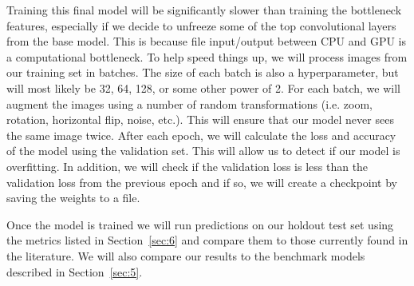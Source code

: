 \documentclass[10pt, a4paper, twocolumn]{article} %
\begin{document}
Training this final model will be significantly slower than training the bottleneck features, especially if we decide to unfreeze some of the top convolutional layers from the base model.  This is because file input/output between CPU and GPU is a computational bottleneck.  To help speed things up, we will process images from our training set in batches.  The size of each batch is also a hyperparameter, but will most likely be 32, 64, 128, or some other power of 2. For each batch, we will augment the images using a number of random transformations (i.e. zoom, rotation, horizontal flip, noise, etc.).  This will ensure that our model never sees the same image twice. After each epoch, we will calculate the loss and accuracy of the model using the validation set.  This will allow us to detect if our model is overfitting.  In addition, we will check if the validation loss is less than the validation loss from the previous epoch and if so, we will create a checkpoint by saving the weights to a file.

Once the model is trained we will run predictions on our holdout test set using the metrics listed in Section~\ref{sec:6} and compare them to those currently found in the literature.  We will also compare our results to the benchmark models described in Section~\ref{sec:5}.





\end{document}
